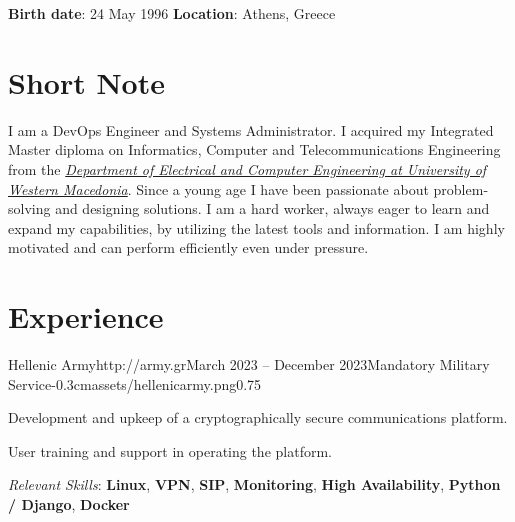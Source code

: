 \documentclass{mycv}
\begin{document}
	\pagestyle{empty}
	\centering
	{\bf Birth date}: 24 May 1996 {\Large\textperiodcentered} {\bf Location}: Athens, Greece

	\section{Short Note}
	\textnormal I am a DevOps Engineer and Systems Administrator. I acquired my Integrated Master diploma on Informatics, Computer and Telecommunications Engineering from the \href{https://ece.uowm.gr/?lan=en}{\textit{Department of Electrical and Computer Engineering at University of Western Macedonia}}. Since a young age I have been passionate about problem-solving and designing solutions. I am a hard worker, always eager to learn and expand my capabilities, by utilizing the latest tools and information. I am highly motivated and can perform efficiently even under pressure.

	\section{Experience}

	\begin{EntryDatedLogo}{Hellenic Army}{http://army.gr}{March 2023 -- December 2023}{Mandatory Military Service}{-0.3cm}{assets/hellenicarmy.png}{0.75}
		\vspace{-0.2cm}
		\begin{Itemize}
			\item Development and upkeep of a cryptographically secure communications platform.
			\item User training and support in operating the platform.
  \item \textit{Relevant Skills}: \textbf{Linux}, \textbf{VPN}, \textbf{SIP}, \textbf{Monitoring}, \textbf{High Availability}, \textbf{Python / Django}, \textbf{Docker}
		\end{Itemize}
	\end{EntryDatedLogo}

	\vspace{0.75cm}
\end{document}
